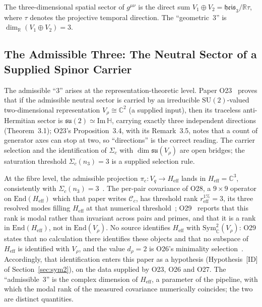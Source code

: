 \documentclass[11pt,a4paper]{article}
\newcommand{\Heff}{H_{\mathrm{eff}}}
\newcommand{\ImH}{\mathrm{Im}\,\mathbb{H}}
\newcommand{\su}{\mathfrak{su}}
\newcommand{\heis}{\mathfrak{heis}_3}
\newcommand{\Vr}{V_\rho}
\newcommand{\Sym}{\mathrm{Sym}}
\begin{document}
    The three-dimensional spatial sector of $g^{\mu\nu}$ is the direct sum
    $V_1 \oplus V_2 = \heis / \mathbb{R}\tau$, where $\tau$ denotes the projective temporal direction.
    The ``geometric~$3$'' is $\dim_\mathbb{R}(V_1 \oplus V_2) = 3$.

  \subsection{The Admissible Three: The Neutral Sector of a Supplied Spinor Carrier}
    \label{sec:adm3}

    The admissible ``3'' arises at the representation-theoretic level.
    Paper O23~\cite{Beau2026a27} proves that if the admissible neutral sector is carried by an
    irreducible $\mathrm{SU}(2)$-valued two-dimensional representation
    $V_\rho \cong \mathbb{C}^2$ (a supplied input), then its traceless anti-Hermitian sector is
    $\su(2) \simeq \ImH$, carrying exactly
    three independent
    directions (Theorem~3.1); O23's Proposition~3.4, with its Remark~3.5, notes that a count of
    generator axes can stop
    at two, so ``directions'' is the correct reading.
    The carrier selection and the identification of $\Sigma_c$ with $\dim \su(V_\rho)$ are open
    bridges; the saturation threshold $\Sigma_c(n_3) = 3$ is a supplied selection rule.

    At the fibre level, the admissible projection $\pi_c : V_q \to \Heff$ lands in
    $\Heff = \mathbb{C}^3$, consistently with $\Sigma_c(n_3) = 3$~\cite{Beau2026a32}.
    The per-pair covariance of O28, a $9 \times 9$ operator on $\mathrm{End}(\Heff)$ which that
    paper writes $\mathcal{C}_c$, has threshold rank $r_{\mathrm{eff}}^{1\%} = 3$, its three
    resolved modes filling $\Heff$ at that numerical threshold~\cite{Beau2026a32}; O29~\cite{Beau2026a33} reports that
    this rank is modal rather
    than invariant across pairs and primes, and that it is a rank in $\mathrm{End}(\Heff)$, not in
    $\mathrm{End}(\Vr)$.
    No source identifies $\Heff$ with $\Sym^2_\mathbb{C}(\Vr)$: O29 states that no calculation
    there identifies these objects and that no subspace of $\Heff$ is identified with $\Vr$, and
    the value $d_\rho = 2$ is O26's minimality selection~\cite{Beau2026a30}.
    Accordingly, that identification enters this paper as a hypothesis
    (Hypothesis~[ID] of Section~\ref{sec:sym2}), on the data supplied by O23, O26 and O27.
    The ``admissible~3'' is the complex dimension of $\Heff$, a parameter of the pipeline, with
    which the modal rank of the measured covariance numerically coincides; the two are distinct
    quantities.
\end{document}
